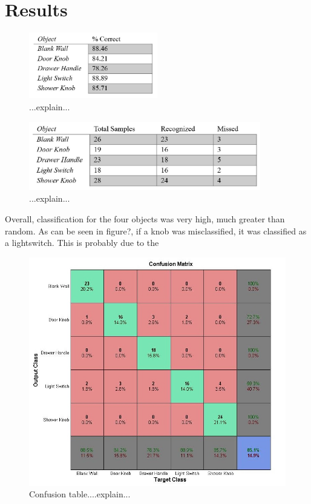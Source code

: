 \documentclass{article}
\begin{document}
\section{Results}
\begin{figure}[h!]
    \centering
    \includegraphics[width=0.5\textwidth]{Results_1.JPG}
    \caption{...explain...}
    \label{fig:results1}
\end{figure}
\begin{figure}[h!]
    \centering
    \includegraphics[width=0.9\textwidth]{Results_2.JPG}
    \caption{...explain...}
    \label{fig:results2}
\end{figure}
Overall, classification for the four objects was very high, much greater than random. As can be seen in figure?, if a knob was misclassified, it was classified as a lightswitch. This is probably due to the 

\begin{figure}[h!]
    \centering
    \includegraphics[width=.6\textwidth]{confusion.jpg}
    \caption{Confusion table....explain...}
    \label{fig:confusion}
\end{figure}
\end{document}
